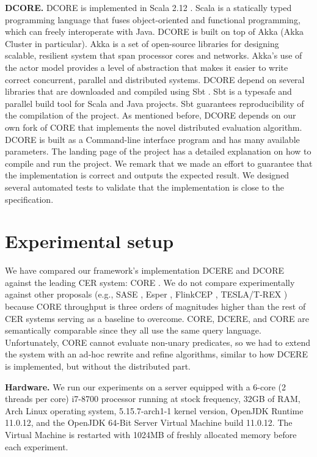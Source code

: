 \textbf{DCORE.} DCORE is implemented in Scala 2.12 \cite{scala}. Scala \cite{scala} is a statically typed programming language that fuses object-oriented and functional programming, which can freely interoperate with Java. DCORE is built on top of Akka \cite{akka} (Akka Cluster in particular). Akka is a set of open-source libraries for designing scalable, resilient system that span processor cores and networks. Akka’s use of the actor model provides a level of abstraction that makes it easier to write correct concurrent, parallel and distributed systems. DCORE depend on several libraries that are downloaded and compiled using Sbt \cite{sbt}. Sbt is a typesafe and parallel build tool for Scala and Java projects. Sbt guarantees reproducibility of the compilation of the project. As mentioned before, DCORE depends on our own fork of CORE that implements the novel distributed evaluation algorithm. DCORE is built as a Command-line interface program and has many available parameters. The landing page of the project has a detailed explanation on how to compile and run the project. We remark that we made an effort to guarantee that the implementation is correct and outputs the expected result. We designed several automated tests to validate that the implementation is close to the specification.

\section{Experimental setup}\label{sec:setup}


We have compared our framework's implementation DCERE and DCORE against the leading CER system: CORE \cite{core}.
We do not compare experimentally against other proposals (e.g., SASE \cite{sase}, Esper \cite{esper}, FlinkCEP \cite{flink-cep}, TESLA/T-REX \cite{tesla}) because CORE throughput is three orders of magnitudes higher than the rest of CER systems serving as a baseline to overcome. CORE, DCERE, and CORE are semantically comparable since they all use the same query language. Unfortunately, CORE cannot evaluate non-unary predicates, so we had to extend the system with an ad-hoc rewrite and refine algorithms, similar to how DCERE is implemented, but without the distributed part.

\textbf{Hardware.} We run our experiments on a server equipped with a 6-core (2 threads per core) i7-8700 processor running at stock frequency, 32GB of RAM, Arch Linux operating system, 5.15.7-arch1-1 kernel version, OpenJDK Runtime 11.0.12, and the OpenJDK 64-Bit Server Virtual Machine build 11.0.12. The Virtual Machine is restarted with 1024MB of freshly allocated memory before each experiment.

